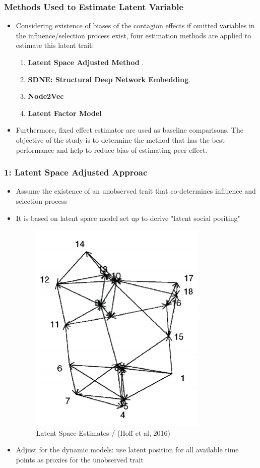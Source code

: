 \documentclass{beamer}
\begin{document}
\begin{frame}
\frametitle{Methods Used to Estimate Latent Variable }
\begin{itemize}
\item Considering existence of biases of the contagion effects if omitted variables in the influence/selection process exist, four estimation methods are applied to estimate this latent trait: 
\vspace{10pt}
\begin{enumerate}
 \item \textbf{Latent Space Adjusted Method}  \textit{\cite{XU2018101}}.
\vspace{10pt}
\item \textbf{SDNE: Structural Deep Network Embedding}\textit{\cite{wang2016structural}}.
\vspace {10pt}
\item \textbf{Node2Vec} \textit{\cite{DBLP:journals/corr/GroverL16}}
\vspace {10pt}
\item \textbf{Latent Factor Model} \textit{\cite{minhas2019inferential}}
\end{enumerate}
\vspace {10pt}
\item Furthermore, fixed  effect estimator are used  as baseline comparisons. The objective of the study is to determine the method that has the best performance and help to reduce bias of estimating peer effect.
\end{itemize}
\end{frame}
\begin{frame}
\frametitle{ 1: Latent Space Adjusted Approac}
\begin{itemize}
\item Assume the existence of an unobserved trait that co-determines influence and selection process
\vspace{10pt}
\item  It is based on latent space  model set up \cite{hoff2002latent} to derive "latent social positing" 
\begin{figure}[h!]
  \centering
  \includegraphics[width=.25\linewidth]{pff.png}
  \caption{Latent Space Estimates / (Hoff et al, 2016)}
  \label{fig:fig1}
\end{figure}
\item Adjust for the dynamic models: use latent position for all available time points as proxies for the unobserved trait
\end{itemize}
\end{frame}
\end{document}
